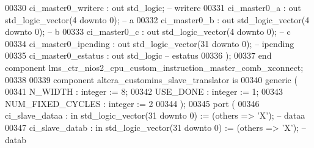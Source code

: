 \begin{DoxyCode}
00330             ci\_master0\_writerc  : \textcolor{keywordflow}{out} \textcolor{comment}{std\_logic};                                        \textcolor{keyword}{-- writerc}
00331             ci\_master0\_a        : \textcolor{keywordflow}{out} \textcolor{comment}{std\_logic\_vector}(\textcolor{vhdllogic}{}\textcolor{vhdllogic}{4} \textcolor{keywordflow}{downto} \textcolor{vhdllogic}{}\textcolor{vhdllogic}{0});                     \textcolor{keyword}{-- a}
00332             ci\_master0\_b        : \textcolor{keywordflow}{out} \textcolor{comment}{std\_logic\_vector}(\textcolor{vhdllogic}{}\textcolor{vhdllogic}{4} \textcolor{keywordflow}{downto} \textcolor{vhdllogic}{}\textcolor{vhdllogic}{0});                     \textcolor{keyword}{-- b}
00333             ci\_master0\_c        : \textcolor{keywordflow}{out} \textcolor{comment}{std\_logic\_vector}(\textcolor{vhdllogic}{}\textcolor{vhdllogic}{4} \textcolor{keywordflow}{downto} \textcolor{vhdllogic}{}\textcolor{vhdllogic}{0});                     \textcolor{keyword}{-- c}
00334             ci\_master0\_ipending : \textcolor{keywordflow}{out} \textcolor{comment}{std\_logic\_vector}(\textcolor{vhdllogic}{}\textcolor{vhdllogic}{31} \textcolor{keywordflow}{downto} \textcolor{vhdllogic}{}\textcolor{vhdllogic}{0});                    \textcolor{keyword}{-- ipending}
00335             ci\_master0\_estatus  : \textcolor{keywordflow}{out} \textcolor{comment}{std\_logic}\textcolor{keyword}{                                         -- estatus}
00336         );
00337     \textcolor{keywordflow}{end} \textcolor{keywordflow}{component} \textcolor{vhdlchar}{lms_ctr_nios2_cpu_custom_instruction_master_comb_xconnect};
00338 
00339     \textcolor{keywordflow}{component} altera\_customins\_slave\_translator \textcolor{keywordflow}{is}
00340         \textcolor{keywordflow}{generic} (
00341             N\_WIDTH          : \textcolor{comment}{integer} := \textcolor{vhdllogic}{}\textcolor{vhdllogic}{8};
00342             USE\_DONE         : \textcolor{comment}{integer} := \textcolor{vhdllogic}{}\textcolor{vhdllogic}{1};
00343             NUM\_FIXED\_CYCLES : \textcolor{comment}{integer} := \textcolor{vhdllogic}{}\textcolor{vhdllogic}{2}
00344         );
00345         \textcolor{keywordflow}{port} (
00346             ci\_slave\_dataa      : \textcolor{keywordflow}{in}  \textcolor{comment}{std\_logic\_vector}(\textcolor{vhdllogic}{}\textcolor{vhdllogic}{31} \textcolor{keywordflow}{downto} \textcolor{vhdllogic}{}\textcolor{vhdllogic}{0}) := (\textcolor{keywordflow}{others} => 'X'); \textcolor{keyword}{-- dataa}
00347             ci\_slave\_datab      : \textcolor{keywordflow}{in}  \textcolor{comment}{std\_logic\_vector}(\textcolor{vhdllogic}{}\textcolor{vhdllogic}{31} \textcolor{keywordflow}{downto} \textcolor{vhdllogic}{}\textcolor{vhdllogic}{0}) := (\textcolor{keywordflow}{others} => 'X'); \textcolor{keyword}{-- datab}

\end{DoxyCode}
